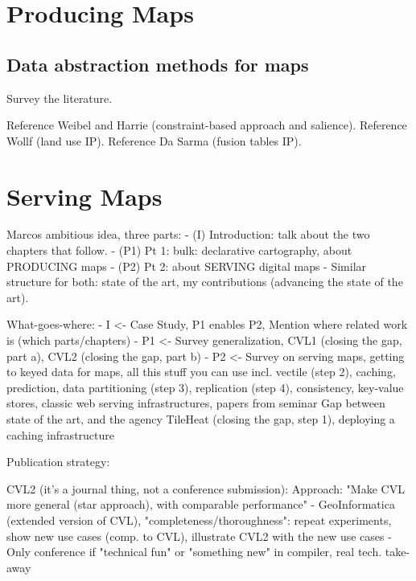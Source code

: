 \documentclass[11pt, oneside]{report}   	%
\begin{document}
\part{Producing Maps}

\chapter{Data abstraction methods for maps}
Survey the literature.

Reference Weibel and Harrie (constraint-based approach and salience). Reference Wollf (land use IP). Reference Da Sarma (fusion tables IP).


\chapter{}


\part{Serving Maps}






Marcos ambitious idea, three parts:
- (I) Introduction: talk about the two chapters that follow. 
- (P1) Pt 1: bulk: declarative cartography, about PRODUCING maps
- (P2) Pt 2: about SERVING digital maps
- Similar structure for both: state of the art, my contributions (advancing the state of the art).  

What-goes-where:
- I <- Case Study, P1 enables P2, Mention where related work is (which parts/chapters)
- P1 <- 
        Survey generalization, 
        CVL1 (closing the gap, part a), 
        CVL2 (closing the gap, part b)
- P2 <- 
        Survey on serving maps, getting to keyed data for maps, all this stuff you can use 
                incl. vectile (step 2),
                caching,
                prediction,
                data partitioning (step 3), 
                replication (step 4), 
                consistency, 
                key-value stores, 
                classic web serving infrastructures,
                papers from seminar
        Gap between state of the art, and the agency
        TileHeat (closing the gap, step 1), deploying a caching infrastructure
        
Publication strategy:

CVL2 (it's a journal thing, not a conference submission):
Approach: "Make CVL more general (star approach), with comparable performance"
- GeoInformatica (extended version of CVL), "completeness/thoroughness": repeat experiments, show new use cases (comp. to CVL), illustrate CVL2 with the new use cases 
- Only conference if "technical fun" or "something new" in compiler, real tech. take-away
\end{document}
